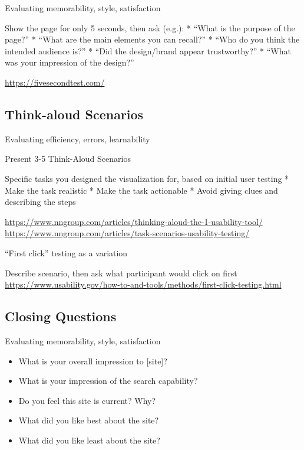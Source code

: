 \documentclass[
]{krantz}
\providecommand{\tightlist}{%
  \setlength{\itemsep}{0pt}\setlength{\parskip}{0pt}}
\begin{document}
Evaluating memorability, style, satisfaction

Show the page for only 5 seconds, then ask (e.g.):
* ``What is the purpose of the page?''
* ``What are the main elements you can recall?''
* ``Who do you think the intended audience is?''
* ``Did the design/brand appear trustworthy?''
* ``What was your impression of the design?''

\url{https://fivesecondtest.com/}

\hypertarget{think-aloud-scenarios}{%
\subsection{Think-aloud Scenarios}\label{think-aloud-scenarios}}

Evaluating efficiency, errors, learnability

Present 3-5 Think-Aloud Scenarios

Specific tasks you designed the visualization for, based on initial user testing
* Make the task realistic
* Make the task actionable
* Avoid giving clues and describing the steps

\url{https://www.nngroup.com/articles/thinking-aloud-the-1-usability-tool/}
\url{https://www.nngroup.com/articles/task-scenarios-usability-testing/}

``First click'' testing as a variation

Describe scenario, then ask what participant would click on first
\url{https://www.usability.gov/how-to-and-tools/methods/first-click-testing.html}

\hypertarget{closing-questions}{%
\subsection{Closing Questions}\label{closing-questions}}

Evaluating memorability, style, satisfaction

\begin{itemize}
\tightlist
\item
  What is your overall impression to {[}site{]}?
\item
  What is your impression of the search capability?
\item
  Do you feel this site is current? Why?
\item
  What did you like best about the site?
\item
  What did you like least about the site?
\end{itemize}
\end{document}
